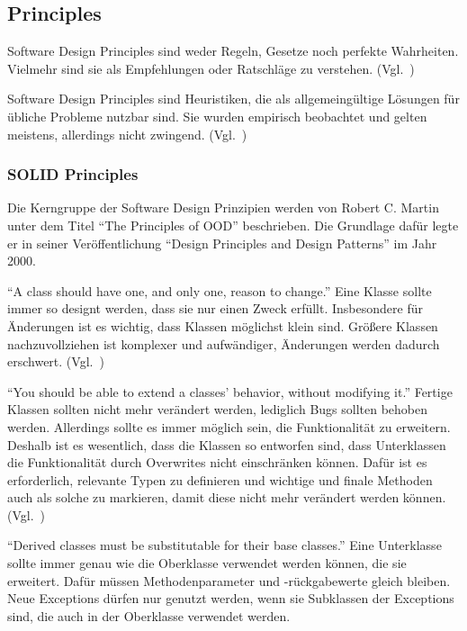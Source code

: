 \subsection{Principles}
Software Design Principles sind weder Regeln, Gesetze noch perfekte Wahrheiten.
Vielmehr sind sie als Empfehlungen oder Ratschläge zu verstehen.
(Vgl.~\cite{getting-a-solid-start})

Software Design Principles sind Heuristiken, die als allgemeingültige Lösungen für übliche Probleme nutzbar sind.
Sie wurden empirisch beobachtet und gelten meistens, allerdings nicht zwingend.
(Vgl.~\cite{getting-a-solid-start})

\subsubsection{SOLID Principles}
Die Kerngruppe der Software Design Prinzipien werden von Robert C. Martin unter dem Titel \enquote{The Principles of OOD}\cite{solid} beschrieben.
Die Grundlage dafür legte er in seiner Veröffentlichung \enquote{Design Principles and Design Patterns}\cite{design-principles-and-design-patterns} im Jahr 2000.

\enquote{A class should have one, and only one, reason to change.}\cite{solid}
Eine Klasse sollte immer so designt werden, dass sie nur einen Zweck erfüllt\cite{different-types-of-software-design-principles}.
Insbesondere für Änderungen ist es wichtig, dass Klassen möglichst klein sind.
Größere Klassen nachzuvollziehen ist komplexer und aufwändiger, Änderungen werden dadurch erschwert.
(Vgl.~\cite{clean-code})

\enquote{You should be able to extend a classes' behavior, without modifying it.}\cite{solid}
Fertige Klassen sollten nicht mehr verändert werden, lediglich Bugs sollten behoben werden.
Allerdings sollte es immer möglich sein, die Funktionalität zu erweitern.
Deshalb ist es wesentlich, dass die Klassen so entworfen sind, dass Unterklassen die Funktionalität durch Overwrites nicht einschränken können.
Dafür ist es erforderlich, relevante Typen zu definieren und wichtige und finale Methoden auch als solche zu markieren, damit diese nicht mehr verändert werden können.
(Vgl.~\cite{different-types-of-software-design-principles})

\newpage

\enquote{Derived classes must be substitutable for their base classes.}\cite{solid}
Eine Unterklasse sollte immer genau wie die Oberklasse verwendet werden können, die sie erweitert\cite{different-types-of-software-design-principles}.
Dafür müssen Methodenparameter und -rückgabewerte gleich bleiben.
Neue Exceptions dürfen nur genutzt werden, wenn sie Subklassen der Exceptions sind, die auch in der Oberklasse verwendet werden.

